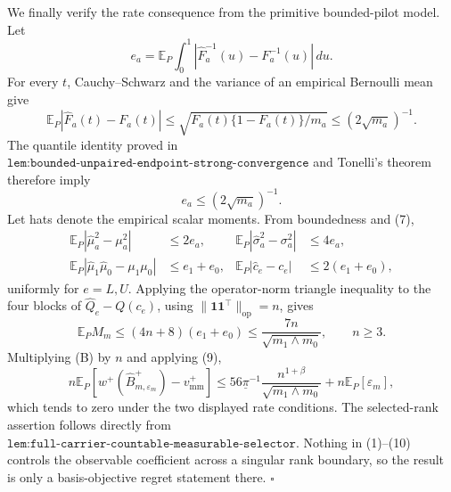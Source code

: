 We finally verify the rate consequence from the primitive bounded-pilot model.  Let
\[
e_a=\mathbb E_P\int_0^1
|\widehat F_a^{-1}(u)-F_a^{-1}(u)|\,du.
\]
For every \(t\), Cauchy--Schwarz and the variance of an empirical Bernoulli mean give
\[
\mathbb E_P|\widehat F_a(t)-F_a(t)|
\le\sqrt{F_a(t)\{1-F_a(t)\}/m_a}
\le(2\sqrt{m_a})^{-1}.
\]
The quantile identity proved in \(\texttt{lem:bounded-unpaired-endpoint-strong-convergence}\) and Tonelli's theorem therefore imply
\[
e_a\le(2\sqrt{m_a})^{-1}.
\tag{7}
\]
Let hats denote the empirical scalar moments.  From boundedness and (7),
\[
\begin{aligned}
\mathbb E_P|\widehat\mu_a^2-\mu_a^2|&\le2e_a,
&\mathbb E_P|\widehat\sigma_a^2-\sigma_a^2|&\le4e_a,\\
\mathbb E_P|\widehat\mu_1\widehat\mu_0-\mu_1\mu_0|
&\le e_1+e_0,
&\mathbb E_P|\widehat c_e-c_e|&\le2(e_1+e_0),
\end{aligned}
\tag{8}
\]
uniformly for \(e=L,U\).  Applying the operator-norm triangle inequality to the four blocks of \(\widehat Q_e-Q(c_e)\), using \(\lVert\mathbf1\mathbf1^{\top}\rVert_{\mathrm{op}}=n\), gives
\[
\mathbb E_P M_m
\le(4n+8)(e_1+e_0)
\le\frac{7n}{\sqrt{m_1\wedge m_0}},
\qquad n\ge3.
\tag{9}
\]
Multiplying (B) by \(n\) and applying (9),
\[
n\mathbb E_P\!\left[
w^+(\widehat B_{m,\varepsilon_m}^+)-v_{\mathrm{mm}}^+
\right]
\le
56\underline\pi^{-1}
\frac{n^{1+\beta}}{\sqrt{m_1\wedge m_0}}
+n\mathbb E_P[\varepsilon_m],
\tag{10}
\]
which tends to zero under the two displayed rate conditions.  The selected-rank assertion follows directly from \(\texttt{lem:full-carrier-countable-measurable-selector}\).  Nothing in (1)--(10) controls the observable coefficient across a singular rank boundary, so the result is only a basis-objective regret statement there. \(\square\)